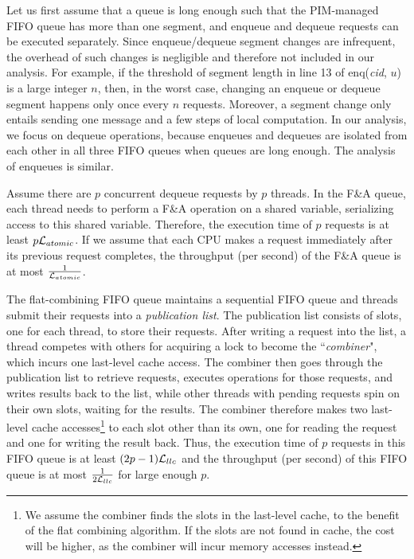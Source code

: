 Let us first assume that a queue is long enough such that the PIM-managed FIFO queue 
has more than one segment, and enqueue and dequeue requests can be executed separately. 
Since enqueue/dequeue segment changes are infrequent, 
the overhead of such changes is negligible and therefore not included in our analysis.
For example, if the threshold of segment length in line 13 of enq(\textit{cid}, $u$) is a large integer $n$, 
then, in the worst case, changing an enqueue or dequeue segment happens only once every $n$ requests.
Moreover, a segment change only entails sending one message and a few steps of local computation.
In our analysis, we focus on dequeue operations, because enqueues and dequeues are isolated from each other in all three FIFO queues when queues are long enough.
The analysis of enqueues is similar. 

Assume there are $p$ concurrent dequeue requests by $p$ threads. 
In the F\&A queue, each thread needs to perform a F\&A operation on a shared variable, 
serializing access to this shared variable. 
Therefore, 
the execution time of $p$ requests is at least $p\mathcal{L}_{atomic}$. 
If we assume that each CPU makes a request immediately after its previous request completes, 
the throughput (per second) of the F\&A queue is at most ${1 \over \mathcal{L}_{atomic}}$. 

The flat-combining FIFO queue maintains a sequential FIFO queue and
threads submit their requests into a \emph{publication list}.  The
publication list consists of slots, one for each thread, to store
their requests.  After writing a request into the list, a thread
competes with others for acquiring a lock to become the
``\emph{combiner}", which incurs one last-level cache access.  The
combiner then goes through the publication list to retrieve requests,
executes operations for those requests, and writes results back to the
list, while other threads with pending requests spin on their own
slots, waiting for the results.  The combiner therefore makes two
last-level cache accesses\footnote{ We assume the combiner finds the
  slots in the last-level cache, to the benefit of the flat combining
  algorithm. If the slots are not found in cache, the cost will be
  higher, as the combiner will incur memory accesses instead.} to each
slot other than its own, one for reading the request and one for
writing the result back.  Thus, the execution time of $p$ requests in
this FIFO queue is at least $(2p-1)\mathcal{L}_{llc}$ and the throughput (per
second) of this FIFO queue is at most ${1 \over 2\mathcal{L}_{llc}}$ for large
enough $p$.

